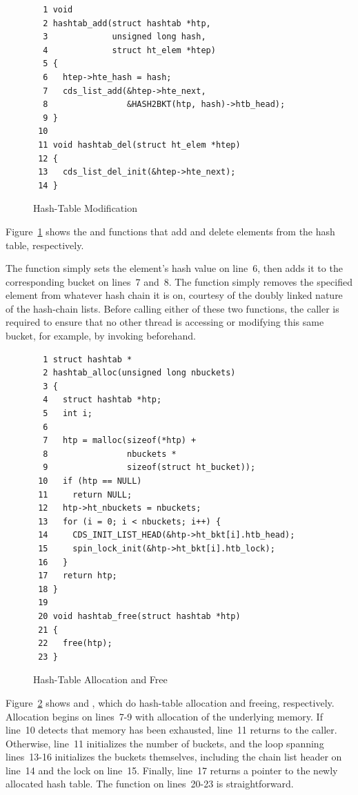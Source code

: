 \begin{figure}[tb]
{ \scriptsize
\begin{verbatim}
  1 void
  2 hashtab_add(struct hashtab *htp,
  3             unsigned long hash,
  4             struct ht_elem *htep)
  5 {
  6   htep->hte_hash = hash;
  7   cds_list_add(&htep->hte_next,
  8                &HASH2BKT(htp, hash)->htb_head);
  9 }
 10 
 11 void hashtab_del(struct ht_elem *htep)
 12 {
 13   cds_list_del_init(&htep->hte_next);
 14 }
\end{verbatim}
}
\caption{Hash-Table Modification}
\label{fig:datastruct:Hash-Table Modification}
\end{figure}

Figure~\ref{fig:datastruct:Hash-Table Modification}
shows the  and  functions
that add and delete elements from the hash table, respectively.

The  function simply sets the element's hash
value on line~6, then adds it to the corresponding bucket on
lines~7 and~8.
The  function simply removes the specified element
from whatever hash chain it is on, courtesy of the doubly linked
nature of the hash-chain lists.
Before calling either of these two functions, the caller is required to
ensure that no other thread is accessing
or modifying this same bucket, for example, by invoking
 beforehand.

\begin{figure}[tb]
{ \scriptsize
\begin{verbatim}
  1 struct hashtab *
  2 hashtab_alloc(unsigned long nbuckets)
  3 {
  4   struct hashtab *htp;
  5   int i;
  6 
  7   htp = malloc(sizeof(*htp) +
  8                nbuckets *
  9                sizeof(struct ht_bucket));
 10   if (htp == NULL)
 11     return NULL;
 12   htp->ht_nbuckets = nbuckets;
 13   for (i = 0; i < nbuckets; i++) {
 14     CDS_INIT_LIST_HEAD(&htp->ht_bkt[i].htb_head);
 15     spin_lock_init(&htp->ht_bkt[i].htb_lock);
 16   }
 17   return htp;
 18 }
 19 
 20 void hashtab_free(struct hashtab *htp)
 21 {
 22   free(htp);
 23 }
\end{verbatim}
}
\caption{Hash-Table Allocation and Free}
\label{fig:datastruct:Hash-Table Allocation and Free}
\end{figure}

Figure~\ref{fig:datastruct:Hash-Table Allocation and Free}
shows  and ,
which do hash-table allocation and freeing, respectively.
Allocation begins on lines~7-9 with allocation of the underlying memory.
If line~10 detects that memory has been exhausted, line~11 returns
 to the caller.
Otherwise, line~11 initializes the number of buckets, and the loop
spanning lines~13-16 initializes the buckets themselves,
including the chain list header on line~14 and the lock on line~15.
Finally, line~17 returns a pointer to the newly allocated hash table.
The  function on lines~20-23 is straightforward.

